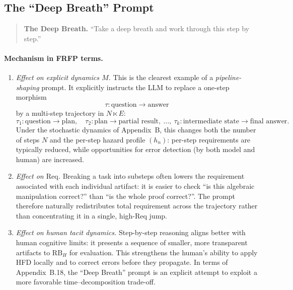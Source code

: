 \subsection{The ``Deep Breath'' Prompt}

\begin{quote}
\textbf{The Deep Breath.} ``Take a deep breath and work through this
step by step.''
\end{quote}

\paragraph{Mechanism in FRFP terms.}

\begin{enumerate}
  \item \emph{Effect on explicit dynamics $M$.} This is the clearest
    example of a \emph{pipeline-shaping} prompt. It explicitly instructs
    the LLM to replace a one-step morphism
    \[
      \tau : \text{question} \to \text{answer}
    \]
    by a multi-step trajectory in $N \ltimes E$:
    \[
      \tau_1 : \text{question} \to \text{plan},\quad
      \tau_2 : \text{plan} \to \text{partial result},\ \dots,\ 
      \tau_k : \text{intermediate state} \to \text{final answer}.
    \]
    Under the stochastic dynamics of Appendix~B, this changes both
    the number of steps $N$ and the per-step hazard profile $(h_n)$:
    per-step requirements are typically reduced, while opportunities for
    error detection (by both model and human) are increased.

  \item \emph{Effect on $\mathrm{Req}$.} Breaking a task into substeps
    often lowers the requirement associated with each individual artifact:
    it is easier to check ``is this algebraic manipulation correct?''
    than ``is the whole proof correct?''. The prompt therefore naturally
    redistributes total requirement across the trajectory rather than
    concentrating it in a single, high-Req jump.

  \item \emph{Effect on human tacit dynamics.} Step-by-step reasoning
    aligns better with human cognitive limits: it presents a sequence of
    smaller, more transparent artifacts to $\mathrm{RB}_H$ for evaluation.
    This strengthens the human's ability to apply HFD locally and to
    correct errors before they propagate. In terms of Appendix~B.18, the
    ``Deep Breath'' prompt is an explicit attempt to exploit a more
    favorable time--decomposition trade-off.
\end{enumerate}

